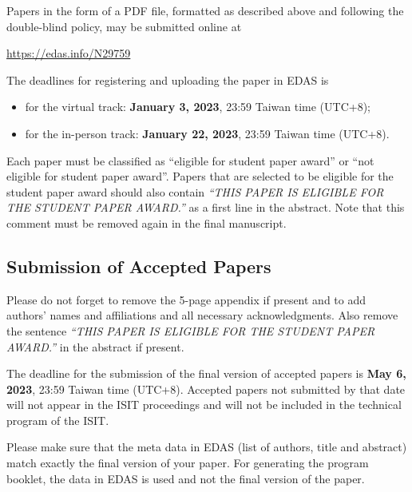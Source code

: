 \documentclass[conference,a4paper]{IEEEtran}
\begin{document}
Papers in the form of a PDF file, formatted as described above and
following the double-blind policy, may be submitted online at
\begin{center}
  \url{https://edas.info/N29759}
\end{center}
The deadlines for registering and uploading the paper in EDAS is
\begin{itemize}
\item for the virtual track: \textbf{January 3, 2023}, 23:59 Taiwan
  time (UTC+8);
\item for the in-person track: \textbf{January 22, 2023}, 23:59 Taiwan
  time (UTC+8).
\end{itemize}
Each paper must be classified as ``eligible for student paper award''
or ``not eligible for student paper award''. Papers that are selected
to be eligible for the student paper award should also contain
\emph{``THIS PAPER IS ELIGIBLE FOR THE STUDENT PAPER AWARD.''} as a
first line in the abstract. Note that this comment must be removed
again in the final manuscript.

\subsection{Submission of Accepted Papers}
\label{sec:subm-final-vers}

Please do not forget to remove the 5-page appendix if present and to
add authors' names and affiliations and all necessary acknowledgments.
Also remove the sentence \emph{``THIS PAPER IS ELIGIBLE FOR THE
  STUDENT PAPER AWARD.''} in the abstract if present.

The deadline for the submission of the final version of accepted
papers is \textbf{May 6, 2023}, 23:59 Taiwan time (UTC+8).  Accepted
papers not submitted by that date will not appear in the ISIT
proceedings and will not be included in the technical program of the
ISIT.

Please make sure that the meta data in EDAS (list of authors, title
and abstract) match exactly the final version of your paper. For
generating the program booklet, the data in EDAS is used and not the
final version of the paper.


%
\end{document}
